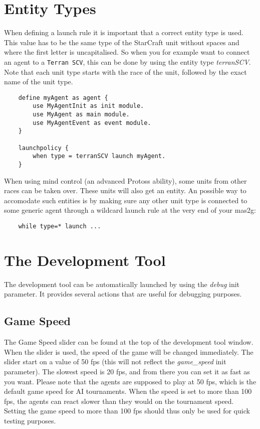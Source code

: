 \section{Entity Types}
When defining a launch rule it is important that a correct entity type is used. This value has to be the same type of the StarCraft unit without spaces and where the first letter is uncapitalised. So when you for example want to connect an agent to a \texttt{Terran SCV}, this can be done by using the entity type \textit{terranSCV}. Note that each unit type starts with the race of the unit, followed by the exact name of the unit type.

\begin{verbatim}
    define myAgent as agent {
        use MyAgentInit as init module.
        use MyAgent as main module.
        use MyAgentEvent as event module.
    }

    launchpolicy {
        when type = terranSCV launch myAgent.
    }
\end{verbatim}

When using mind control (an advanced Protoss ability), some units from other races can be taken over. These units will also get an entity. An possible way to accomodate such entities is by making sure any other unit type is connected to some generic agent through a wildcard launch rule at the very end of your mas2g: \begin{verbatim}
    while type=* launch ...
\end{verbatim}


\newpage
\section{The Development Tool}
\label{development tool}
The development tool can be automatically launched by using the \textit{debug} init parameter. It provides several actions that are useful for debugging purposes.

\subsection{Game Speed}
The Game Speed slider can be found at the top of the development tool window. When the slider is used, the speed of the game will be changed immediately. The slider start on a value of 50 fps (this will not reflect the \textit{game\_speed} init parameter). The slowest speed is 20 fps, and from there you can set it as fast as you want. Please note that the agents are supposed to play at 50 fps, which is the default game speed for AI tournaments. When the speed is set to more than 100 fps, the agents can react slower than they would on the tournament speed. Setting the game speed to more than 100 fps should thus only be used for quick testing purposes.


